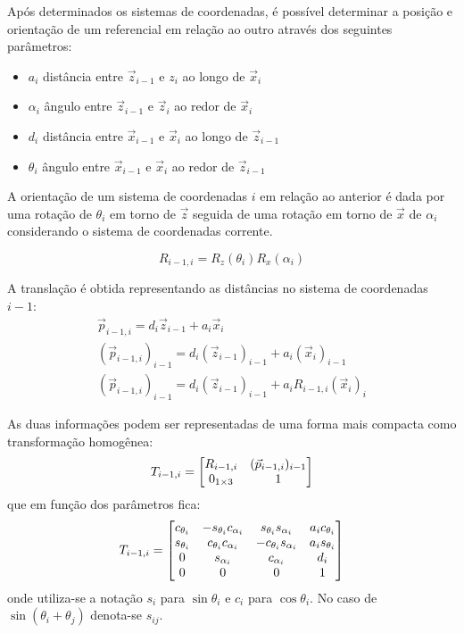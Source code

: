 Após determinados os sistemas de coordenadas, é possível determinar a posição e orientação de um referencial em relação ao outro através dos seguintes parâmetros:
\begin{itemize}
\item $a_i$ distância entre $\vec{z}_{i-1}$ e $z_i$ ao longo de $\vec{x}_i$
\item $\alpha_i$ ângulo entre $\vec{z}_{i-1}$ e $\vec{z}_i$ ao redor de $\vec{x}_i$
\item $d_i$ distância entre $\vec{x}_{i-1}$ e $\vec{x}_i$ ao longo de $\vec{z}_{i-1}$
\item $\theta_i$ ângulo entre $\vec{x}_{i-1}$ e $\vec{x}_i$ ao redor de $\vec{z}_{i-1}$
\end{itemize}

A orientação de um sistema de coordenadas $i$ em relação ao anterior é dada por uma rotação de $\theta_i$ em torno de $\vec{z}$ seguida de uma rotação em torno de $\vec{x}$ de $\alpha_i$ considerando o sistema de coordenadas corrente.

\begin{equation}
{R}_{i-1,i} = {R}_z(\theta_i){R}_x(\alpha_i)
\end{equation}

A translação é obtida representando as distâncias no sistema de coordenadas $i-1$:
\begin{gather}
{\vec{p}}_{i-1,i} = d_i {\vec{z}}_{i-1} + a_i {\vec{x}}_i \\
({\vec{p}}_{i-1,i})_{i-1} = d_i ({\vec{z}}_{i-1})_{i-1} + a_i ({\vec{x}}_i)_{i-1} \\
({\vec{p}}_{i-1,i})_{i-1} = d_i ({\vec{z}}_{i-1})_{i-1} + a_i {R}_{i-1,i}({\vec{x}}_i)_{i} 
\end{gather}

As duas informações podem ser representadas de uma forma mais compacta como transformação homogênea:
\begin{equation}
T_{i-1,i} = \begin{bmatrix}
    R_{i-1,i}       &  ({\vec{p}}_{i-1,i})_{i-1} \\
    0_{1 \times 3}  &                             1
\end{bmatrix}
\end{equation}
que em função dos parâmetros fica:
\begin{equation} \label{eq:transform_dh}
T_{i-1,i} = \begin{bmatrix}
    c_{\theta_i}  & -s_{\theta_i}c_{\alpha_i}   &   s_{\theta_i}s_{\alpha_i}  & a_i c_{\theta_i} \\ 
    s_{\theta_i}  & c_{\theta_i}c_{\alpha_i}    &  -c_{\theta_i}s_{\alpha_i}  & a_i s_{\theta_i} \\
    0             & s_{\alpha_i}                &   c_{\alpha_i}              & d_i              \\
    0             & 0                           &   0                         & 1
\end{bmatrix}
\end{equation}
onde utiliza-se a notação $s_i$ para $\sin \theta_i$ e $c_i$ para $\cos \theta_i$. No caso de  $\sin (\theta_i + \theta_j)$ denota-se $s_{ij}$.

